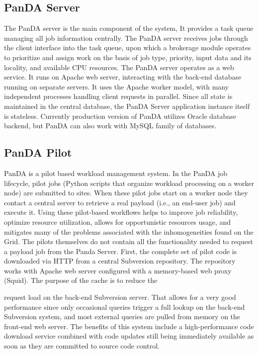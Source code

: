 \documentclass[10pt, conference, compsocconf]{IEEEtran}
\begin{document}
\subsection{PanDA Server}
The PanDA server is the main component of the system, It provides  a task queue managing all job information centrally. The PanDA  server receives jobs through the client interface into the task queue, upon which a brokerage module  operates to prioritize  and assign work on the basis of job type, priority, input data and its locality, and available CPU resources. The PanDA  server operates as a web service. It runs on Apache web server, interacting with the back-end database running  on separate servers. It uses the Apache worker  model, with many independent   processes  handling client requests  in  parallel. Since all  state is maintained  in  the central database,  the PanDA Server application instance itself is stateless. Currently production version of PanDA utilizes Oracle database backend, but PanDA  can also work with MySQL family of databases.

\subsection{PanDA Pilot}
 PanDA is a pilot based workload  management system. In the PanDA job lifecycle, pilot jobs (Python scripts that organize workload processing on a worker  node) are submitted to sites. When these  pilot jobs start on a  worker node they contact a central  server  to retrieve  a real payload (i.e., an end-user job) and execute it. Using these pilot-based  workflows helps to improve job reliability, optimize resource utilization, allows for opportunistic  resources usage, and mitigates  many of the problems  associated with the inhomogeneities found on the Grid.
The pilots themselves  do not contain all the functionality needed to request a payload  job from the Panda Server. First, the complete  set of pilot code is downloaded via HTTP from a  central Subversion repository.  The repository works with Apache web server configured  with a  memory-based   web proxy (Squid). The purpose  of the cache  is to reduce  the

request load on the back-end Subversion  server. That allows for a  very good performance since only occasional  queries trigger a  full  lookup on the back-end  Subversion  system, and most external  queries are pulled from memory on the front-end web server. The benefits of this system include a high-performance code download service combined with code updates still being immediately  available  as soon as they are committed to source code control.
\end{document}
